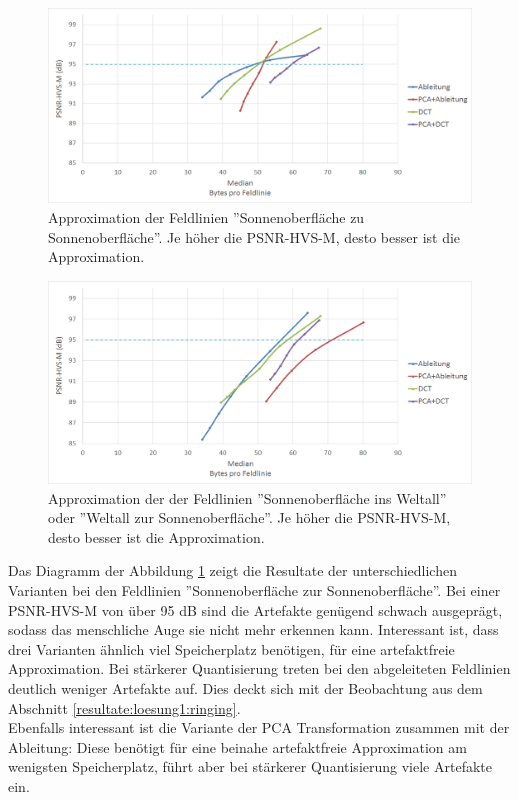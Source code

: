 \begin{figure}[!htbp]
	\center	\includegraphics[width=1\textwidth,keepaspectratio]{./pictures/resultate/loesung1/ringing/sts.png}
	\caption{Approximation der Feldlinien ''Sonnenoberfläche zu Sonnenoberfläche''. Je höher die PSNR-HVS-M, desto besser ist die Approximation. }	\label{resultate:loesung1:dct:behandlung_ringing:sts}
\end{figure} 
\begin{figure}[!htbp]
	\center
\includegraphics[width=1\textwidth,keepaspectratio]{./pictures/resultate/loesung1/ringing/nosts.png}
	\caption{Approximation der der Feldlinien ''Sonnenoberfläche ins Weltall'' oder ''Weltall zur Sonnenoberfläche''. Je höher die PSNR-HVS-M, desto besser ist die Approximation.}	\label{resultate:loesung1:dct:behandlung_ringing:nosts}
\end{figure}
Das Diagramm der Abbildung \ref{resultate:loesung1:dct:behandlung_ringing:sts} zeigt die Resultate der unterschiedlichen Varianten bei den Feldlinien ''Sonnenoberfläche zur Sonnenoberfläche''. Bei einer PSNR-HVS-M von über 95 dB sind die Artefakte genügend schwach ausgeprägt, sodass das menschliche Auge sie nicht mehr erkennen kann. Interessant ist, dass drei Varianten ähnlich viel Speicherplatz benötigen, für eine artefaktfreie Approximation. Bei stärkerer Quantisierung treten bei den abgeleiteten Feldlinien deutlich weniger Artefakte auf. Dies deckt sich mit der Beobachtung aus dem Abschnitt \ref{resultate:loesung1:ringing}.\\
Ebenfalls interessant ist die Variante der PCA Transformation zusammen mit der Ableitung: Diese benötigt für eine beinahe artefaktfreie Approximation am wenigsten Speicherplatz, führt aber bei stärkerer Quantisierung viele Artefakte ein.


